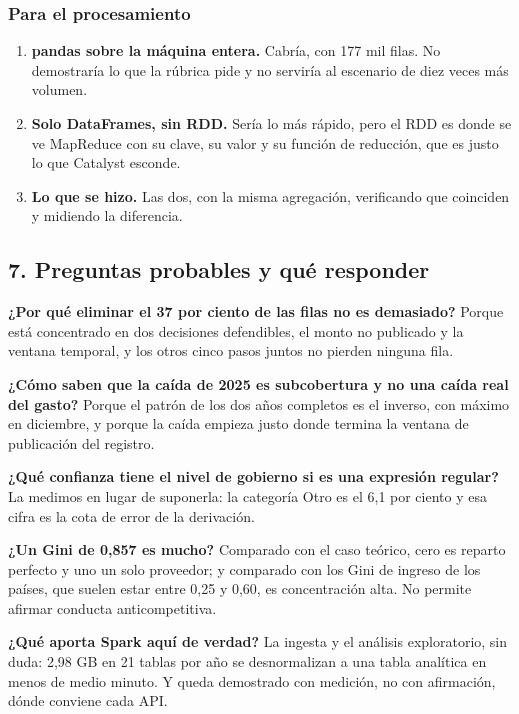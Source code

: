 \documentclass[11pt]{article}
\begin{document}
\subsubsection*{Para el procesamiento}
\begin{enumerate}
  \item \textbf{pandas sobre la máquina entera.} Cabría, con 177 mil filas. No demostraría lo que la rúbrica pide y no serviría al escenario de diez veces más volumen.
  \item \textbf{Solo DataFrames, sin RDD.} Sería lo más rápido, pero el RDD es donde se ve MapReduce con su clave, su valor y su función de reducción, que es justo lo que Catalyst esconde.
  \item \textbf{Lo que se hizo.} Las dos, con la misma agregación, verificando que coinciden y midiendo la diferencia.
\end{enumerate}
\subsection*{7. Preguntas probables y qué responder}
\textbf{¿Por qué eliminar el 37 por ciento de las filas no es demasiado?} Porque está concentrado en dos decisiones defendibles, el monto no publicado y la ventana temporal, y los otros cinco pasos juntos no pierden ninguna fila.

\textbf{¿Cómo saben que la caída de 2025 es subcobertura y no una caída real del gasto?} Porque el patrón de los dos años completos es el inverso, con máximo en diciembre, y porque la caída empieza justo donde termina la ventana de publicación del registro.

\textbf{¿Qué confianza tiene el nivel de gobierno si es una expresión regular?} La medimos en lugar de suponerla: la categoría Otro es el 6,1 por ciento y esa cifra es la cota de error de la derivación.

\textbf{¿Un Gini de 0,857 es mucho?} Comparado con el caso teórico, cero es reparto perfecto y uno un solo proveedor; y comparado con los Gini de ingreso de los países, que suelen estar entre 0,25 y 0,60, es concentración alta. No permite afirmar conducta anticompetitiva.

\textbf{¿Qué aporta Spark aquí de verdad?} La ingesta y el análisis exploratorio, sin duda: 2,98 GB en 21 tablas por año se desnormalizan a una tabla analítica en menos de medio minuto. Y queda demostrado con medición, no con afirmación, dónde conviene cada API.
\end{document}
